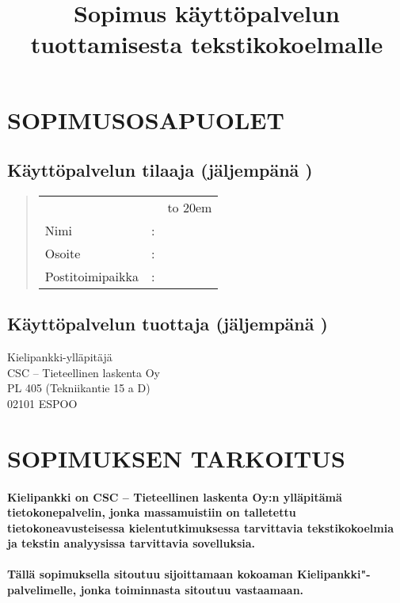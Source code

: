 \documentclass[a4paper,finnish]{article}
\begin{document}
\title{Sopimus käyttöpalvelun tuottamisesta tekstikokoelmalle} 
\author{}
\date{}
\maketitle

\section{SOPIMUSOSAPUOLET}

\subsection{Käyttöpalvelun tilaaja (jäljempänä )}

\begin{quote}
  \def\arraystretch{1.2}
  \begin{tabular}{lcl}
    &&\hbox to 20em{}\\
    Nimi&:&\\
    \cline{3-3}
    Osoite&:&\\
    \cline{3-3}
    Postitoimipaikka&:&\\
    \cline{3-3}
  \end{tabular}
\end{quote}

\subsection{Käyttöpalvelun tuottaja (jäljempänä )}

	Kielipankki-ylläpitäjä \\
	CSC -- Tieteellinen laskenta Oy\\
	PL 405 (Tekniikantie 15 a D)\\
	02101 ESPOO			

\section{SOPIMUKSEN TARKOITUS}

\paragraph{Kielipankki on CSC -- Tieteellinen laskenta Oy:n ylläpitämä
tietokonepalvelin, jonka massamuistiin on talletettu
tietokoneavusteisessa kielentutkimuksessa tarvittavia tekstikokoelmia
ja tekstin analyysissa tarvittavia sovelluksia.}
 
\paragraph{Tällä sopimuksella  sitoutuu sijoittamaan
 kokoaman 
Kielipankki"-palvelimelle, jonka toiminnasta  sitoutuu
vastaamaan.}
\end{document}
